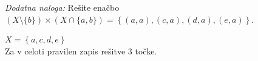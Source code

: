 \documentclass[addpoints]{exam}
\begin{document}
\begin{questions}
    
    \bonusquestion[3]
    \textit{Dodatna naloga:} Rešite enačbo $(X\setminus\{b\})\times(X \cap \{a,b\})=\left\{(a,a),(c,a),(d,a),(e,a)\right\}$.

    \begin{solution}
        $X=\left\{a,c,d,e\right\}$ \\
        Za v celoti pravilen zapis rešitve $3$ točke.
    \end{solution}

\end{questions}
\end{document}

